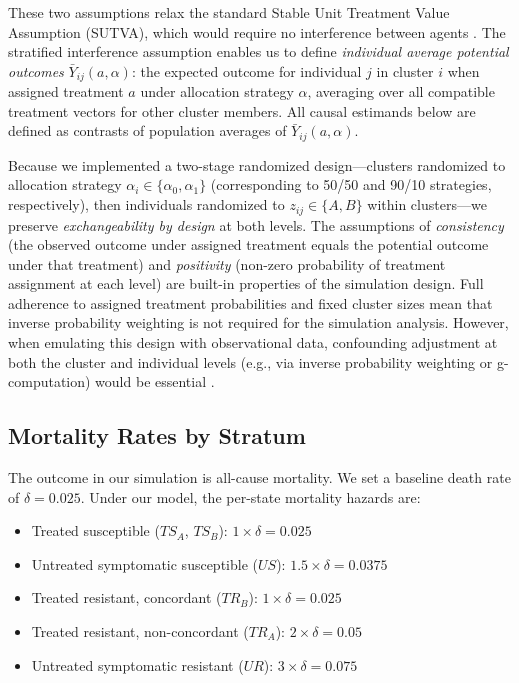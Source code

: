 \documentclass[preprint,11pt]{elsarticle}
\begin{document}
These two assumptions relax the standard Stable Unit Treatment Value Assumption (SUTVA), which would require no interference between agents \citep{hudgens_toward_2008}. The stratified interference assumption enables us to define \textit{individual average potential outcomes} $\bar{Y}_{ij}(a, \alpha)$: the expected outcome for individual $j$ in cluster $i$ when assigned treatment $a$ under allocation strategy $\alpha$, averaging over all compatible treatment vectors for other cluster members. All causal estimands below are defined as contrasts of population averages of $\bar{Y}_{ij}(a, \alpha)$.

Because we implemented a two-stage randomized design---clusters randomized to allocation strategy $\alpha_i \in \{\alpha_0, \alpha_1\}$ (corresponding to 50/50 and 90/10 strategies, respectively), then individuals randomized to $z_{ij} \in \{A, B\}$ within clusters---we preserve \textit{exchangeability by design} at both levels. The assumptions of \textit{consistency} (the observed outcome under assigned treatment equals the potential outcome under that treatment) and \textit{positivity} (non-zero probability of treatment assignment at each level) are built-in properties of the simulation design. Full adherence to assigned treatment probabilities and fixed cluster sizes mean that inverse probability weighting is not required for the simulation analysis. However, when emulating this design with observational data, confounding adjustment at both the cluster and individual levels (e.g., via inverse probability weighting or g-computation) would be essential \citep{tchetgen_tchetgen_causal_2012}.

\subsection{Mortality Rates by Stratum}\label{sec:mortality}

The outcome in our simulation is all-cause mortality. We set a baseline death rate of $\delta = 0.025$. Under our model, the per-state mortality hazards are:
\begin{itemize}
  \item Treated susceptible ($TS_A$, $TS_B$): $1 \times \delta = 0.025$
  \item Untreated symptomatic susceptible ($US$): $1.5 \times \delta = 0.0375$
  \item Treated resistant, concordant ($TR_B$): $1 \times \delta = 0.025$
  \item Treated resistant, non-concordant ($TR_A$): $2 \times \delta = 0.05$
  \item Untreated symptomatic resistant ($UR$): $3 \times \delta = 0.075$
\end{itemize}
\end{document}
